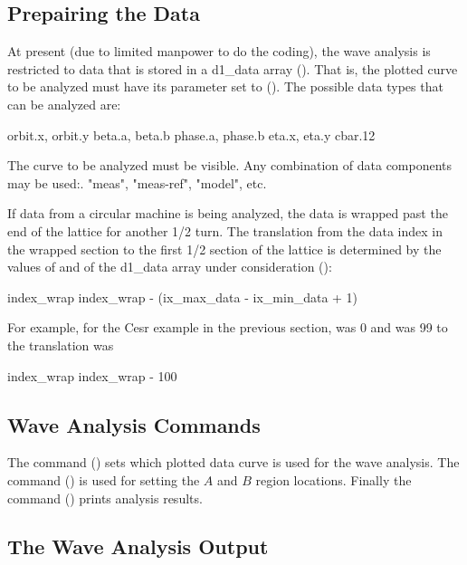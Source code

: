 \subsection{Prepairing the Data} 
\label{ss:wave.data}

At present (due to limited manpower to do the
coding), the wave analysis is restricted to data that is stored in a
d1_data array (). That is, the plotted curve to be
analyzed must have its  parameter set to
 (). The possible data types that
can be analyzed are:
\begin{example}
  orbit.x, orbit.y
  beta.a,  beta.b
  phase.a, phase.b
  eta.x, eta.y
  cbar.12
\end{example}
The curve to be analyzed must be visible. Any combination of data
components may be used:. "meas", "meas-ref", "model", etc.

If data from a circular machine is being analyzed, the data is wrapped
past the end of the lattice for another 1/2 turn. The translation from
the data index in the wrapped section to the first 1/2 section of the
lattice is determined by the values of  and
 of the d1_data array under consideration
():
\begin{example}
  index_wrap \longrightarrow index_wrap - (ix_max_data - ix_min_data + 1)
\end{example}
For example, for the Cesr example in the previous section,
 was 0 and  was 99 to the translation
was
\begin{example}
  index_wrap \longringtarrow index_wrap - 100
\end{example}

\subsection{Wave Analysis Commands}
\label{ss:wave.cmd}

The  command () sets which plotted data curve
is used for the wave analysis. The  command () 
is used for setting the $A$ and $B$ region locations. Finally the 
 command () prints analysis results. 

\subsection{The Wave Analysis Output}
\label{ss:wave.cmd}


